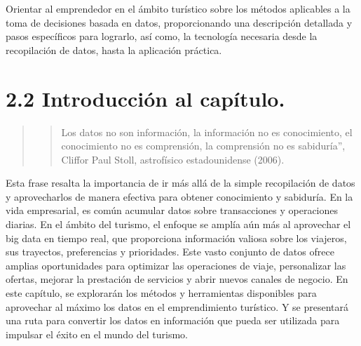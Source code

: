\documentclass[
  letterpaper,
  DIV=11,
  numbers=noendperiod]{scrreprt}
\begin{document}
Orientar al emprendedor en el ámbito turístico sobre los métodos
aplicables a la toma de decisiones basada en datos, proporcionando una
descripción detallada y pasos específicos para lograrlo, así como, la
tecnología necesaria desde la recopilación de datos, hasta la aplicación
práctica.

\hypertarget{introducciuxf3n-al-capuxedtulo.}{%
\section{2.2 Introducción al
capítulo.}\label{introducciuxf3n-al-capuxedtulo.}}

\begin{quote}
\begin{quote}
Los datos no son información, la información no es conocimiento, el
conocimiento no es comprensión, la comprensión no es sabiduría'',
Cliffor Paul Stoll, astrofísico estadounidense (2006).
\end{quote}
\end{quote}

Esta frase resalta la importancia de ir más allá de la simple
recopilación de datos y aprovecharlos de manera efectiva para obtener
conocimiento y sabiduría. En la vida empresarial, es común acumular
datos sobre transacciones y operaciones diarias. En el ámbito del
turismo, el enfoque se amplía aún más al aprovechar el big data en
tiempo real, que proporciona información valiosa sobre los viajeros, sus
trayectos, preferencias y prioridades. Este vasto conjunto de datos
ofrece amplias oportunidades para optimizar las operaciones de viaje,
personalizar las ofertas, mejorar la prestación de servicios y abrir
nuevos canales de negocio. En este capítulo, se explorarán los métodos y
herramientas disponibles para aprovechar al máximo los datos en el
emprendimiento turístico. Y se presentará una ruta para convertir los
datos en información que pueda ser utilizada para impulsar el éxito en
el mundo del turismo.
\end{document}
